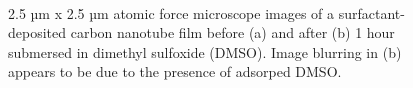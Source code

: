 \documentclass[
  a4paper,
]{scrbook}
\begin{document}
\begin{figure}

\begin{minipage}[t]{0.47\linewidth}

{\centering 


}

\subcaption{\label{fig-pristine-afm}}
\end{minipage}%
%
\begin{minipage}[t]{0.05\linewidth}

{\centering 

~

}

\end{minipage}%
%
\begin{minipage}[t]{0.47\linewidth}

{\centering 


}

\subcaption{\label{fig-DMSO-afm}}
\end{minipage}%

\caption{\label{fig-afm-solvent}2.5 µm x 2.5 µm atomic force microscope
images of a surfactant-deposited carbon nanotube film before (a) and
after (b) 1 hour submersed in dimethyl sulfoxide (DMSO). Image blurring
in (b) appears to be due to the presence of adsorped DMSO.}

\end{figure}
\end{document}
